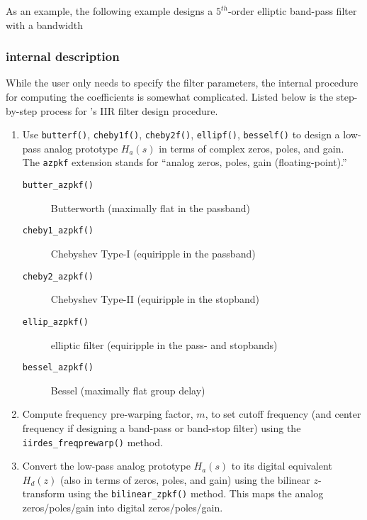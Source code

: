 %
As an example, the following example designs a $5^{th}$-order elliptic
band-pass filter with a bandwidth
%


\subsubsection{internal description}
\label{module:filter:iirdes:internal}
While the user only needs to specify the filter parameters,
the internal procedure for computing the coefficients is somewhat
complicated.
Listed below is the step-by-step process for \liquid's IIR filter design
procedure.
%
\begin{enumerate}
\item Use {\tt butterf()}, {\tt cheby1f()}, {\tt cheby2f()}, {\tt ellipf()},
      {\tt besself()} to design a low-pass analog prototype $H_a(s)$
      in terms of complex zeros, poles, and gain.
      The {\tt azpkf} extension stands for ``analog zeros, poles, gain
      (floating-point).''

    \begin{description}
    \item[{\tt butter\_azpkf()}] Butterworth (maximally flat in the passband)
    \item[{\tt cheby1\_azpkf()}] Chebyshev Type-I (equiripple in the passband)
    \item[{\tt cheby2\_azpkf()}] Chebyshev Type-II (equiripple in the stopband)
    \item[{\tt ellip\_azpkf() }] elliptic filter (equiripple in the pass- and
        stopbands)
    \item[{\tt bessel\_azpkf()}] Bessel (maximally flat group delay)
    \end{description}

\item Compute frequency pre-warping factor, $m$, to set cutoff frequency (and
      center frequency if designing a band-pass or band-stop filter) using the
      {\tt iirdes\_freqprewarp()} method.

\item Convert the low-pass analog prototype $H_a(s)$ to its digital
      equivalent $H_d(z)$ (also in terms of zeros, poles, and gain)
      using the bilinear $z$-transform using the {\tt bilinear\_zpkf()}
      method.
      This maps the analog zeros/poles/gain into digital
      zeros/poles/gain.


\end{enumerate}
